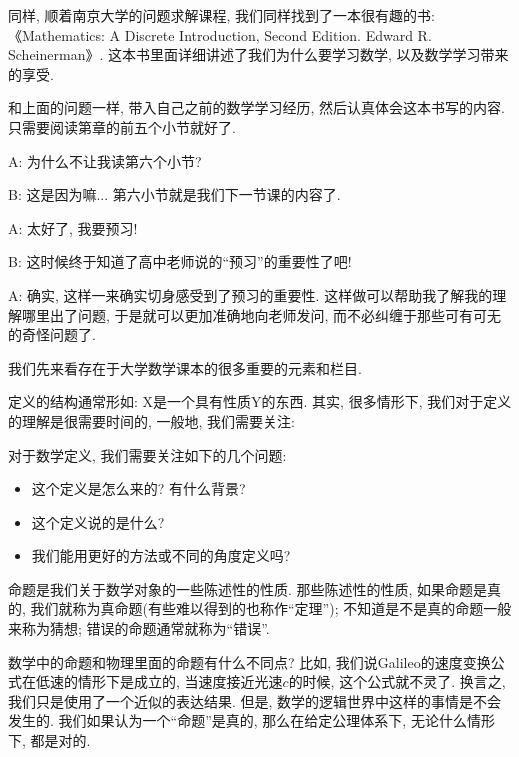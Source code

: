 同样, 顺着南京大学的问题求解课程, 我们同样找到了一本很有趣的书: 《Mathematics: A Discrete Introduction, Second Edition. Edward R. Scheinerman》. 这本书里面详细讲述了我们为什么要学习数学, 以及数学学习带来的享受. 

\begin{prob}
	和上面的问题一样, 带入自己之前的数学学习经历, 然后认真体会这本书写的内容. 只需要阅读第章的前五个小节就好了. 
\end{prob}

\begin{dialogue}
	A: 为什么不让我读第六个小节?
	
	B: 这是因为嘛... 第六小节就是我们下一节课的内容了.
	
	A: 太好了, 我要预习! 
	
	B: 这时候终于知道了高中老师说的``预习''的重要性了吧!
	
	A: 确实, 这样一来确实切身感受到了预习的重要性. 这样做可以帮助我了解我的理解哪里出了问题, 于是就可以更加准确地向老师发问, 而不必纠缠于那些可有可无的奇怪问题了. 
	
\end{dialogue}

我们先来看存在于大学数学课本的很多重要的元素和栏目. 

定义的结构通常形如: X是一个具有性质Y的东西. 其实, 很多情形下, 我们对于定义的理解是很需要时间的, 一般地, 我们需要关注:

\begin{idea}
	对于数学定义, 我们需要关注如下的几个问题: 
	\begin{itemize}
		\item 这个定义是怎么来的? 有什么背景?
		\item 这个定义说的是什么?
		\item 我们能用更好的方法或不同的角度定义吗?
	\end{itemize}
\end{idea}

 命题是我们关于数学对象的一些陈述性的性质. 那些陈述性的性质, 如果命题是真的, 我们就称为真命题(有些难以得到的也称作``定理''); 不知道是不是真的命题一般来称为猜想; 错误的命题通常就称为``错误''. 

数学中的命题和物理里面的命题有什么不同点? 比如, 我们说Galileo的速度变换公式在低速的情形下是成立的, 当速度接近光速$c$的时候, 这个公式就不灵了. 换言之, 我们只是使用了一个近似的表达结果. 但是, 数学的逻辑世界中这样的事情是不会发生的. 我们如果认为一个``命题''是真的, 那么在给定公理体系下, 无论什么情形下, 都是对的. 

